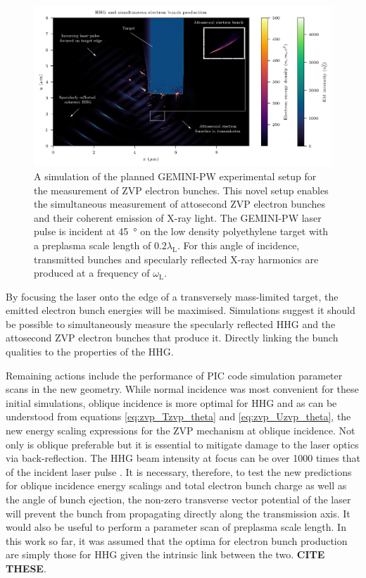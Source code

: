 \begin{figure}
	\centering
	\includegraphics[width=1\linewidth]{figures/zvp/Experiment_setup_HHG_bunches2}
	\caption[Planned GEMINI-PW experimental setup for the measurement of ZVP electron bunches.]{A simulation of the planned GEMINI-PW experimental setup for the measurement of ZVP electron bunches. This novel setup enables the simultaneous measurement of attosecond ZVP electron bunches and their coherent emission of X-ray light. The GEMINI-PW laser pulse is incident at \qty{45}{\degree} on the low density polyethylene target with a preplasma scale length of $0.2\lambda_\mathrm{L}$. For this angle of incidence, transmitted bunches and specularly reflected X-ray harmonics are produced at a frequency of $\omega_\mathrm{L}$.}
	\label{fig:experimentsetuphhgbunches2}
\end{figure}
By focusing the laser onto the edge of a transversely mass-limited target, the emitted electron bunch energies will be maximised. Simulations suggest it should be possible to simultaneously measure the specularly reflected \ac{HHG} and the attosecond ZVP electron bunches that produce it. Directly linking the bunch qualities to the properties of the \ac{HHG}. 

Remaining actions include the performance of PIC code simulation parameter scans in the new geometry. While normal incidence was most convenient for these initial simulations, oblique incidence is more optimal for \ac{HHG} \cite{gonoskovUltrarelativisticNanoplasmonicsRoute2011, edwardsXRayEmissionEffectiveness2020} and as can be understood from equations \ref{eq:zvp_Tzvp_theta} and \ref{eq:zvp_Uzvp_theta}, the new energy scaling expressions for the ZVP mechanism at oblique incidence. Not only is oblique preferable but it is essential to mitigate damage to the laser optics via back-reflection. The \ac{HHG} beam intensity at focus can be over 1000 times that of the incident laser pulse \cite{quereReflectingPetawattLasers2021}. It is necessary, therefore, to test the new predictions for oblique incidence energy scalings and total electron bunch charge as well as the angle of bunch ejection, the non-zero transverse vector potential of the laser will prevent the bunch from propagating directly along the transmission axis. It would also be useful to perform a parameter scan of preplasma scale length. In this work so far, it was assumed that the optima for electron bunch production are simply those for \ac{HHG} given the intrinsic link between the two. \textbf{CITE THESE}. 


